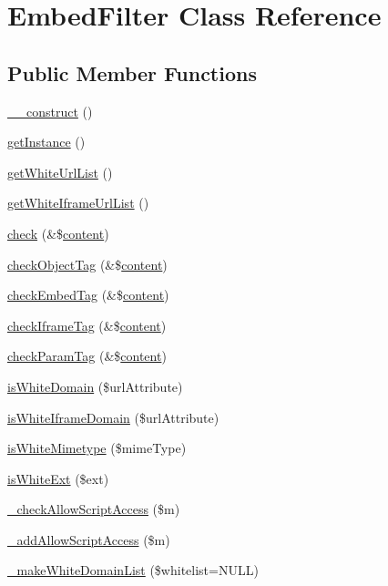 \hypertarget{classEmbedFilter}{\section{Embed\-Filter Class Reference}
\label{classEmbedFilter}
}
\subsection*{Public Member Functions}
\begin{DoxyCompactItemize}
\item 
\hyperlink{classEmbedFilter_a4e13d53c9ac3e5fe04162d916a6c4d83}{\-\_\-\-\_\-construct} ()
\item 
\hyperlink{classEmbedFilter_af8a43e4bc0161225381536c133792463}{get\-Instance} ()
\item 
\hyperlink{classEmbedFilter_a7e931adc623954f9a372b4ea4976f44f}{get\-White\-Url\-List} ()
\item 
\hyperlink{classEmbedFilter_ab67db1799d818d46e47006592b4e7695}{get\-White\-Iframe\-Url\-List} ()
\item 
\hyperlink{classEmbedFilter_ae494226c2201ff0c6c4c85ba429a16cf}{check} (\&\$\hyperlink{classcontent}{content})
\item 
\hyperlink{classEmbedFilter_a3c703c014813fb916c72d95e964a3e0d}{check\-Object\-Tag} (\&\$\hyperlink{classcontent}{content})
\item 
\hyperlink{classEmbedFilter_a6b0bba8c1ef91ae9afe7f26675216cb3}{check\-Embed\-Tag} (\&\$\hyperlink{classcontent}{content})
\item 
\hyperlink{classEmbedFilter_a1026957e48eed307ee66c506f54a1847}{check\-Iframe\-Tag} (\&\$\hyperlink{classcontent}{content})
\item 
\hyperlink{classEmbedFilter_ac0bed1ed95e5b5afb465051ad77d4569}{check\-Param\-Tag} (\&\$\hyperlink{classcontent}{content})
\item 
\hyperlink{classEmbedFilter_a12fcd3bdd961d247598d003b537b5e7f}{is\-White\-Domain} (\$url\-Attribute)
\item 
\hyperlink{classEmbedFilter_ada5403255f1d3612afefdc6d35e03d7f}{is\-White\-Iframe\-Domain} (\$url\-Attribute)
\item 
\hyperlink{classEmbedFilter_a34e7259c822a6c346a218bea0976e1cd}{is\-White\-Mimetype} (\$mime\-Type)
\item 
\hyperlink{classEmbedFilter_ae3cc90883fe1fd15c692ab8268ae15b3}{is\-White\-Ext} (\$ext)
\item 
\hyperlink{classEmbedFilter_a75054db2fbd30ab9392bbccf8dec3885}{\-\_\-check\-Allow\-Script\-Access} (\$m)
\item 
\hyperlink{classEmbedFilter_aac65b76958724ca9ae13ea3d4b6da84b}{\-\_\-add\-Allow\-Script\-Access} (\$m)
\item 
\hyperlink{classEmbedFilter_a9957ded7133614407948d1b2bc43a771}{\-\_\-make\-White\-Domain\-List} (\$whitelist=N\-U\-L\-L)
\end{DoxyCompactItemize}
